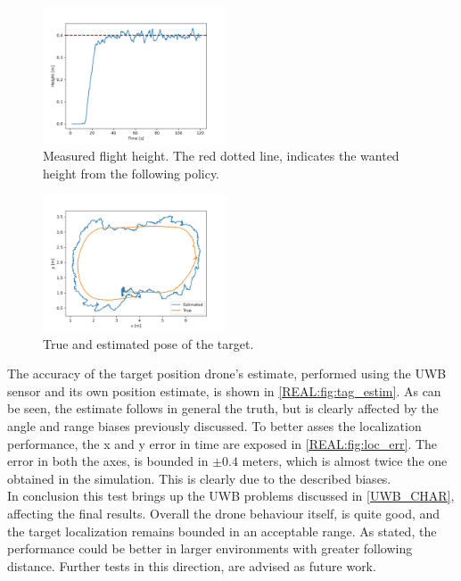 \begin{figure}
    \centering
    \includegraphics[width=0.48\textwidth]{images/real_test/drone_height.png}
    \caption{Measured flight height. The red dotted line, indicates the wanted height from the following policy.}
    \label{REAL:fig:height}
\end{figure}

\begin{figure}
    \centering
    \includegraphics[width=0.48\textwidth]{images/real_test/tag_estim-real_pos.png}
    \caption{True and estimated pose of the target.}
    \label{REAL:fig:tag_estim}
\end{figure}

The accuracy of the target position drone's estimate, performed using the UWB sensor and its own position estimate, is shown in \autoref{REAL:fig:tag_estim}. As can be seen, the estimate follows in general the truth, but is clearly affected by the angle and range biases previously discussed. To better asses the localization performance, the x and y error in time are exposed in \autoref{REAL:fig:loc_err}. The error in both the axes, is bounded in $\pm 0.4$ meters, which is almost twice the one obtained in the simulation. This is clearly due to the described biases.\\

In conclusion this test brings up the UWB problems discussed in \autoref{UWB_CHAR}, affecting the final results. Overall the drone behaviour itself, is quite good, and the target localization remains bounded in an acceptable range. As stated, the performance could be better in larger environments with greater following distance. Further tests in this direction, are advised as future work.

